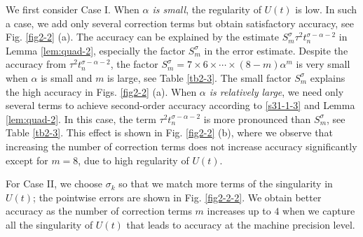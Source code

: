 \documentclass[10pt]{siamltex}
\begin{document}
We first consider Case I.
When {\em $\alpha$ is small}, the regularity of $U(t)$ is low. In such a case, we add only several correction terms but obtain satisfactory accuracy, see Fig. \ref{fig2-2} (a). The accuracy can be explained by
the estimate $S^{\sigma}_{m}\tau^2t_{n}^{\sigma-\alpha-2}$ in Lemma \ref{lem:quad-2}, especially
the factor $S^{\sigma}_{m}$ in the error estimate. Despite the accuracy from $\tau^2t_{n}^{\sigma-\alpha-2}$, the factor  $S_m^{\sigma}=7\times6\times \cdots\times(8-m) \alpha^m$  is very small when $\alpha$ is small and $m$ is large, see Table \ref{tb2-3}.
The small  factor $S^{\sigma}_{m}$  explains the high accuracy in Figs. \ref{fig2-2} (a).
%
When {\em $\alpha$ is relatively large},  we need only several terms  to achieve second-order   accuracy according to \eqref{s31-1-3} and Lemma \ref{lem:quad-2}.
In this case, the term $\tau^2 t_n^{\sigma-\alpha-2}$ is more pronounced than $S_m^\sigma$,  see Table \ref{tb2-3}. This effect is shown in Fig.  \ref{fig2-2} (b), where we observe  that increasing the number of correction terms does  not increase accuracy significantly  except for $m=8$, due to high regularity of $U(t)$.


For Case II, we choose $\sigma_k$ so that we match more terms of the singularity in $U(t)$; the pointwise errors are shown in Fig. \ref{fig2-2-2}. We obtain better accuracy   as the number of correction terms $m$ increases up to $4$ when we capture all the singularity of $U(t)$ that leads to
accuracy at the machine precision level.

\iffalse
the pointwise errors are two orders of magnitude smaller than $\tau^2$, which suggests a small factor in the error estimate. This small factor estimated in Lemma \eqref{lem:quad-2} as $S_m^\sigma$.
\fi
\end{document}
